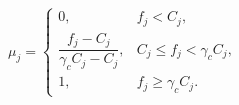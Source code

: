 $\mu_j=\begin{cases}
    0, & f_j<C_j,\\
    \dfrac{f_j-C_j}{\gamma_c C_j-C_j}, & C_j\leq f_j<\gamma_c C_j,\\
    1, & f_j\geq \gamma_c C_j.
    \end{cases}$